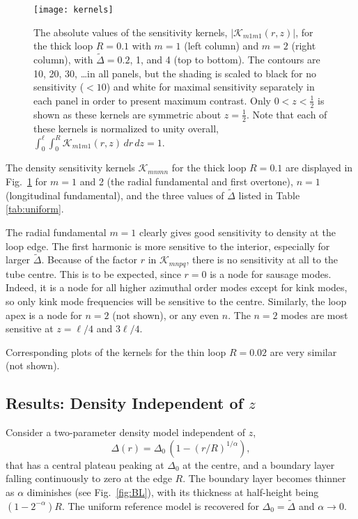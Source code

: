 \documentclass[12pt]{iopart}
\newcommand{\half}{{\textstyle\frac{1}{2}}}
\renewcommand{\L}{{\ell}}
\begin{document}
\begin{figure}[htbp]
\begin{center}
\texttt{[image: kernels]}
\caption{ The absolute values of the sensitivity kernels, $|\mathcal{K}_{m1m1}(r,z)|$, for the thick loop $R=0.1$ with $m=1$ (left column) and $m=2$ (right column), with $\tilde\Delta=0.2$, 1, and 4 (top to bottom). The contours are 10, 20, 30, \ldots in all panels, but the shading is scaled to black for no sensitivity ($<10$) and white for maximal sensitivity separately in each panel in order to present maximum contrast. Only $0<z<\half$ is shown as these kernels are symmetric about $z=\half$. Note that each of these kernels is normalized to unity overall, $\int_0^\ell\int_0^R \mathcal{K}_{m1m1}(r,z)\,dr\,dz=1$.}
\label{fig:kernels}
\end{center}
\end{figure}


The density sensitivity kernels $\mathcal{K}_{mnmn}$ for the thick loop $R=0.1$ are displayed in Fig.~\ref{fig:kernels} for $m=1$ and 2 (the radial fundamental and first overtone), $n=1$ (longitudinal fundamental), and the three values of $\tilde\Delta$ listed in Table \ref{tab:uniform}. 

The radial fundamental $m=1$ clearly gives good sensitivity to density at the loop edge. The first harmonic is more sensitive to the interior, especially for larger $\tilde\Delta$. Because of the factor $r$ in $\mathcal{K}_{mnpq}$, there is no sensitivity at all to the tube centre. This is to be expected, since $r=0$ is a node for sausage modes. Indeed, it is a node for all higher azimuthal order modes except for kink modes, so only kink mode frequencies will be sensitive to the centre. Similarly, the loop apex is a node for $n=2$ {(not shown)}, or any even $n$. The $n=2$ modes are most sensitive at $z=\L/4$ and $3\L/4$.

Corresponding plots of the kernels for the thin loop $R=0.02$ are very similar (not shown). 

\subsection{Results: Density Independent of $z$}  \label{resultsIndep}


Consider a two-parameter density model independent of $z$,
\begin{equation}
{\Delta(r)} = \Delta_0\,\left(1-(r/R)^{1/\alpha}\right), \label{Delta 1D}
\end{equation}
that has a central plateau peaking at $\Delta_0$ at the centre, and a boundary layer falling continuously to zero at the edge $R$. The boundary layer becomes thinner as $\alpha$ diminishes (see Fig.~\ref{fig:BL}), with its thickness at half-height being $(1-2^{-\alpha})R$. The uniform reference model is recovered for $\Delta_0=\tilde\Delta$ and $\alpha\to0$.
\end{document}
